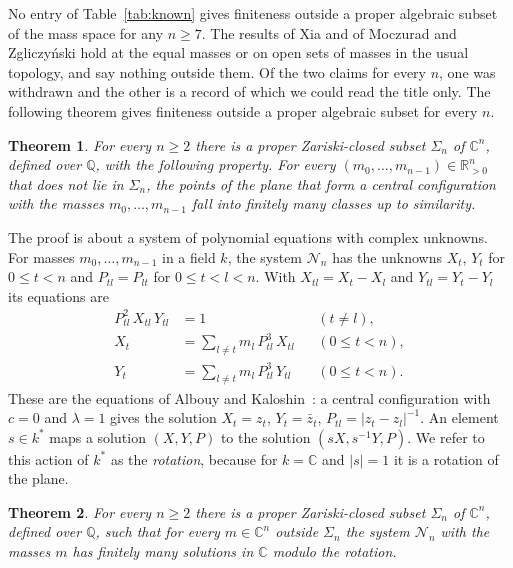 \documentclass[11pt]{amsart}
\newtheorem{theorem}{Theorem}[section]
\theoremstyle{definition}
\theoremstyle{remark}
\numberwithin{equation}{section}
\newcommand{\QQ}{\mathbb{Q}}
\newcommand{\CC}{\mathbb{C}}
\newcommand{\RR}{\mathbb{R}}
\newcommand{\cN}{\mathcal{N}}
\begin{document}
No entry of Table~\ref{tab:known} gives finiteness outside a proper algebraic subset of the mass space
for any $n \ge 7$. The results of Xia and of Moczurad and Zgliczy\'nski hold at the equal masses or on
open sets of masses in the usual topology, and say nothing outside them. Of the two claims for every $n$, one was withdrawn and the other is a record of which we could read the title only. The following theorem gives finiteness outside a proper algebraic
subset for every $n$.

\begin{theorem}\label{thm:main}
For every $n \ge 2$ there is a proper Zariski-closed subset $\Sigma_n$ of $\CC^n$, defined over $\QQ$,
with the following property. For every $(m_0, \dots, m_{n-1}) \in \RR_{>0}^n$ that does not lie in
$\Sigma_n$, the points of the plane that form a central configuration with the masses
$m_0, \dots, m_{n-1}$ fall into finitely many classes up to similarity.
\end{theorem}

The proof is about a system of polynomial equations with complex unknowns. For masses $m_0, \dots, m_{n-1}$ in
a field $k$, the system $\cN_n$ has the unknowns $X_t$, $Y_t$ for $0 \le t < n$ and $P_{tl} = P_{lt}$ for
$0 \le t < l < n$. With $X_{tl} = X_t - X_l$ and $Y_{tl} = Y_t - Y_l$ its equations are
\begin{align}
  P_{tl}^2\, X_{tl}\, Y_{tl} &= 1 && (t \ne l), \label{eq:N1}\\
  X_t &= \sum_{l \ne t} m_l\, P_{tl}^3\, X_{tl} && (0 \le t < n), \label{eq:N2}\\
  Y_t &= \sum_{l \ne t} m_l\, P_{tl}^3\, Y_{tl} && (0 \le t < n). \label{eq:N3}
\end{align}
These are the equations of Albouy and Kaloshin~\cite{albouykaloshin2012}: a central configuration with
$c = 0$ and $\lambda = 1$ gives the solution $X_t = z_t$, $Y_t = \bar z_t$, $P_{tl} = |z_t - z_l|^{-1}$.
An element $s \in k^{*}$ maps a solution $(X, Y, P)$ to the solution $(sX, s^{-1}Y, P)$. We refer to
this action of $k^{*}$ as the \emph{rotation}, because for $k = \CC$ and $|s| = 1$ it is a rotation of
the plane.

\begin{theorem}\label{thm:Nn}
For every $n \ge 2$ there is a proper Zariski-closed subset $\Sigma_n$ of $\CC^n$, defined over $\QQ$,
such that for every $m \in \CC^n$ outside $\Sigma_n$ the system $\cN_n$ with the masses $m$ has finitely
many solutions in $\CC$ modulo the rotation.
\end{theorem}
\end{document}
